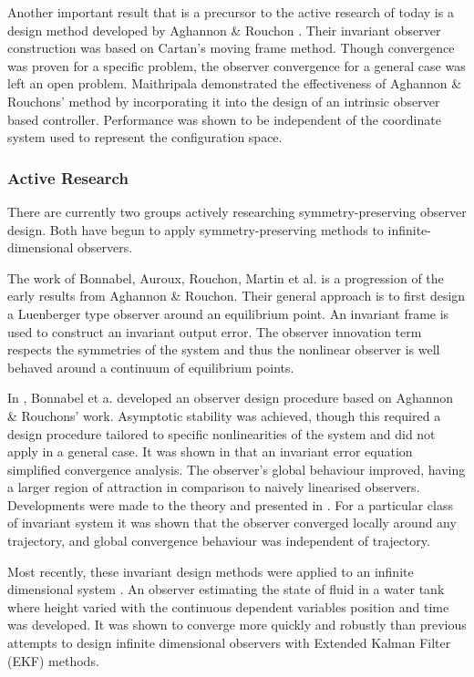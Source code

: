 Another important result that is a precursor to the active research of today is a design method developed by Aghannon \& Rouchon \cite{aghannan2002invariant}. Their invariant observer construction was based on Cartan's moving frame method. Though convergence was proven for a specific problem, the observer convergence for a general case was left an open problem. Maithripala \cite{maithripala2005intrinsic} demonstrated the effectiveness of Aghannon \& Rouchons' method by incorporating it into the design of an intrinsic observer based controller. Performance was shown to be independent of the coordinate system used to represent the configuration space.

\subsubsection{Active Research}
There are currently two groups actively researching symmetry-preserving observer design.  Both have begun to apply symmetry-preserving methods to infinite-dimensional observers.

The work of Bonnabel, Auroux, Rouchon, Martin et al. is a progression of the early results from Aghannon \& Rouchon. Their general approach is to first design a Luenberger type observer around an equilibrium point. An invariant frame is used to construct an invariant output error. The observer innovation term respects the symmetries of the system and thus the nonlinear observer is well behaved around a continuum of equilibrium points. 

In \cite{bonnabel2005invariant}, Bonnabel et a. developed an observer design procedure based on Aghannon \& Rouchons' work. Asymptotic stability was achieved, though this required a design procedure tailored to specific nonlinearities of the system and did not apply in a general case.
It was shown in \cite{bonnabel2008symmetry} that an invariant error equation simplified convergence analysis. The observer's global behaviour improved, having a larger region of attraction in comparison to naively linearised observers.
Developments were made to the theory and presented in \cite{bonnabel2009non}. For a particular class of invariant system it was shown that the observer converged locally around any trajectory, and global convergence behaviour was independent of trajectory.

Most recently, these invariant design methods were applied to an infinite dimensional system \cite{auroux2011symmetry}. An observer estimating the state of fluid in a water tank where height varied with the continuous dependent variables position and time was developed. It was shown to converge more quickly and robustly than previous attempts to design infinite dimensional observers with Extended Kalman Filter (EKF) methods.

